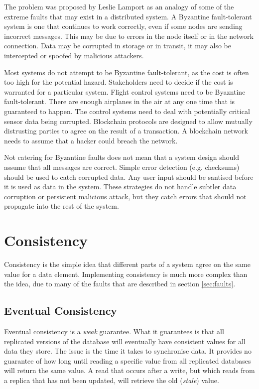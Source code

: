 The problem was proposed by Leslie Lamport as an analogy of some of the extreme faults that may exist in a distributed system.
A Byzantine fault-tolerant system is one that continues to work correctly, even if some nodes are sending incorrect messages.
This may be due to errors in the node itself or in the network connection.
Data may be corrupted in storage or in transit, it may also be intercepted or spoofed by malicious attackers.

Most systems do not attempt to be Byzantine fault-tolerant, as the cost is often too high for the potential hazard.
Stakeholders need to decide if the cost is warranted for a particular system.
Flight control systems need to be Byazntine fault-tolerant.
There are enough airplanes in the air at any one time that
is guaranteed to happen.
The control systems need to deal with potentially critical sensor data being corrupted.
Blockchain protocols are designed to allow mutually distrusting parties to agree on the result of a transaction.
A blockchain network needs to assume that a hacker could breach the network.

Not catering for Byzantine faults does not mean that a system design should assume that all messages are correct.
Simple error detection (e.g. checksums) should be used to catch corrupted data.
Any user input should be santised before it is used as data in the system.
These strategies do not handle subtler data corruption or persistent malicious attack,
but they catch errors that should not propagate into the rest of the system.


\section{Consistency}
Consistency is the simple idea that different parts of a system agree on the same value for a data element.
Implementing consistency is much more complex than the idea, due to many of the faults that are described in section \ref{sec:faults}.

\subsection{Eventual Consistency}

Eventual consistency is a \emph{weak} guarantee.
What it guarantees is that all replicated versions of the database will eventually have consistent values for all data they store.
The issue is the time it takes to synchronise data.
It provides no guarantee of how long until reading a specific value from all replicated databases will return the same value.
A read that occurs after a write, but which reads from a replica that has not been updated, will retrieve the old (\emph{stale}) value.

